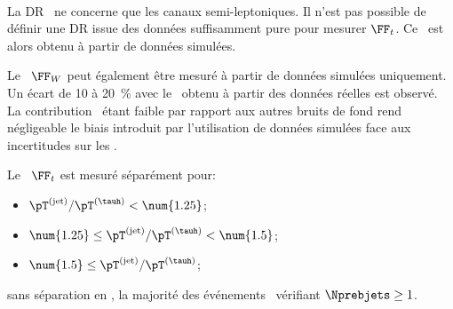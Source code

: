 \paragraph{\ttbar}
La DR \ttbar\ ne concerne que les canaux semi-leptoniques.
Il n'est pas possible de définir une DR issue des données suffisamment pure pour mesurer $\FF_t$.
Ce \fakefactor\ est alors obtenu à partir de données simulées.
\par
Le \fakefactor\ $\FF_W$ peut également être mesuré à partir de données simulées uniquement.
Un écart de \num{10} à \SI{20}{\%} avec le \fakefactor\ obtenu à partir des données réelles est observé.
La contribution \ttbar\ étant faible par rapport aux autres bruits de fond rend négligeable le biais introduit par l'utilisation de données simulées face aux incertitudes sur les \fakefactors.
\par
Le \fakefactor\ $\FF_t$ est mesuré séparément pour:
\begin{itemize}
\item $\pT^{(\text{jet})}/\pT^{(\tauh)} < \num{1.25}$;
\item $\num{1.25} \leq \pT^{(\text{jet})}/\pT^{(\tauh)} < \num{1.5}$;
\item $\num{1.5} \leq \pT^{(\text{jet})}/\pT^{(\tauh)}$;
\end{itemize}
sans séparation en \Nprebjets, la majorité des événements \ttbar\ vérifiant $\Nprebjets\geq1$.
